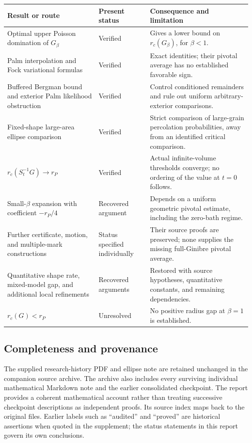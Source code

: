 \documentclass[11pt,a4paper]{article}
\theoremstyle{definition}
\theoremstyle{remark}
\numberwithin{equation}{section}
\begin{document}
\begin{longtable}{@{}L{0.36\textwidth}L{0.20\textwidth}L{0.37\textwidth}@{}}
\toprule
Result or route & Present status & Consequence and limitation\\
\midrule
\endhead
Optimal upper Poisson domination of \(G_\beta\)
& Verified & Gives a lower bound on \(r_c(G_\beta)\), for \(\beta<1\).\\[3pt]
Palm interpolation and Fock variational formulas
& Verified & Exact identities; their pivotal average has no established favorable sign.\\[3pt]
Buffered Bergman bound and exterior Palm likelihood obstruction
& Verified & Control conditioned remainders and rule out uniform arbitrary-exterior comparisons.\\[3pt]
Fixed-shape large-area ellipse comparison
& Verified & Strict comparison of large-grain percolation probabilities, away from an identified critical comparison.\\[3pt]
\(r_c(S_t^{-1}G)\to r_P\)
& Verified & Actual infinite-volume thresholds converge; no ordering of the value at \(t=0\) follows.\\[3pt]
Small-\(\beta\) expansion with coefficient \(-r_P/4\)
& Recovered argument & Depends on a uniform geometric pivotal estimate, including the zero-bath regime.\\[3pt]
Further certificate, motion, and multiple-mark constructions
& Status specified individually & Their source proofs are preserved; none supplies the missing full-Ginibre pivotal average.\\[3pt]
Quantitative shape rate, mixed-model gap, and additional local refinements
& Recovered arguments & Restored with source hypotheses, quantitative constants, and remaining dependencies.\\[3pt]
\(r_c(G)<r_P\)
& Unresolved & No positive radius gap at \(\beta=1\) is established.\\
\bottomrule
\end{longtable}

\subsection*{Completeness and provenance}
The supplied research-history PDF and ellipse note are retained unchanged
in the companion source archive. The archive also includes every surviving
individual mathematical Markdown note and the earlier consolidated checkpoint.
The report provides a coherent mathematical account rather than treating
successive checkpoint descriptions as independent proofs. Its source index
maps back to the original files. Earlier labels such as ``audited'' and
``proved'' are historical assertions when quoted in the supplement;
the status statements in this report govern its own conclusions.
\end{document}
